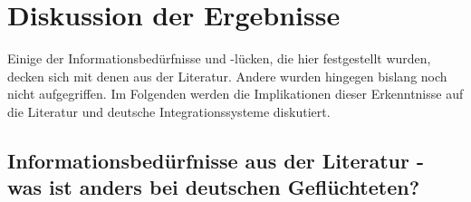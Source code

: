 \section{Diskussion der Ergebnisse}

Einige der Informationsbedürfnisse und -lücken, die hier festgestellt wurden, decken sich mit denen aus der Literatur. Andere wurden hingegen bislang noch nicht aufgegriffen. Im Folgenden werden die Implikationen dieser Erkenntnisse auf die Literatur und deutsche Integrationssysteme diskutiert.

\subsection{Informationsbedürfnisse aus der Literatur - was ist anders bei deutschen Geflüchteten?}

